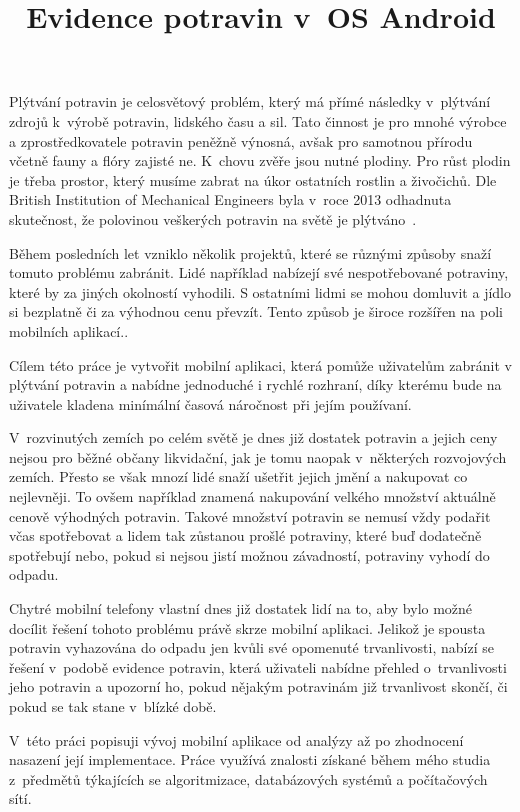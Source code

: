 \documentclass[thesis=B,czech]{FITthesis}[2013/10/20]
\title{Evidence potravin v~OS Android}
\begin{document}
\sloppy


\begin{introduction}

Plýtvání potravin je celosvětový problém, který má přímé následky v~plýtvání zdrojů k~výrobě potravin, lidského času a sil. Tato činnost je pro mnohé výrobce a zprostředkovatele potravin peněžně výnosná, avšak pro samotnou přírodu včetně fauny a flóry zajisté ne. K~chovu zvěře jsou nutné plodiny. Pro růst plodin je třeba prostor, který musíme zabrat na úkor ostatních rostlin a živočichů. Dle British Institution of Mechanical Engineers byla v~roce 2013 odhadnuta skutečnost, že polovinou veškerých potravin na světě je plýtváno~\cite{fakta}.

Během posledních let vzniklo několik projektů, které se různými způsoby snaží tomuto problému zabránit. Lidé například nabízejí své nespotřebované potraviny, které by za jiných okolností vyhodili. S ostatními lidmi se mohou domluvit a jídlo si bezplatně či za výhodnou cenu převzít. Tento způsob je široce rozšířen na poli mobilních aplikací..

Cílem této práce je vytvořit mobilní aplikaci, která pomůže uživatelům zabránit v plýtvání potravin a nabídne jednoduché i rychlé rozhraní, díky kterému bude na uživatele kladena minímální časová náročnost při jejím používaní.

V~rozvinutých zemích po celém světě je dnes již dostatek potravin a jejich ceny nejsou pro běžné občany likvidační, jak je tomu naopak v~některých rozvojových zemích. Přesto se však mnozí lidé snaží ušetřit jejich jmění a nakupovat co nejlevněji. To ovšem například znamená nakupování velkého množství aktuálně cenově výhodných potravin. Takové množství potravin se nemusí vždy podařit včas spotřebovat a lidem tak zůstanou prošlé potraviny, které buď dodatečně spotřebují nebo, pokud si nejsou jistí možnou závadností, potraviny vyhodí do odpadu.

Chytré mobilní telefony vlastní dnes již dostatek lidí na to, aby bylo možné docílit řešení tohoto problému právě skrze mobilní aplikaci. Jelikož je spousta potravin vyhazována do odpadu jen kvůli své opomenuté trvanlivosti, nabízí se řešení v~podobě evidence potravin, která uživateli nabídne přehled o~trvanlivosti jeho potravin a upozorní ho, pokud nějakým potravinám již trvanlivost skončí, či pokud se tak stane v~blízké době.

V~této práci popisuji vývoj mobilní aplikace od analýzy až po zhodnocení nasazení její implementace. Práce využívá znalosti získané během mého studia z~předmětů týkajících se algoritmizace, databázových systémů a počítačových sítí.

\end{introduction}
\end{document}
